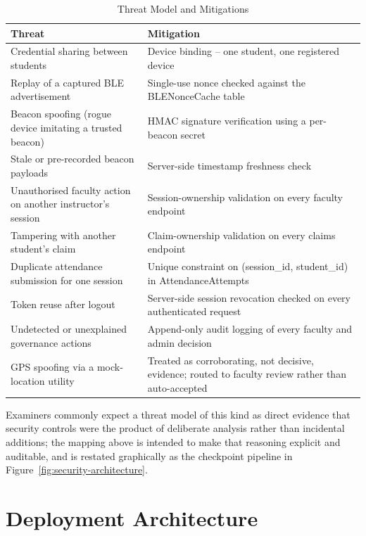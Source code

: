 \documentclass[12pt, a4paper, oneside]{report}
\begin{document}
\begin{table}[htbp]
\centering
\caption{Threat Model and Mitigations}
\label{tab:threat-model}
\small
\begin{tabularx}{\textwidth}{|X|X|}
\hline
\textbf{Threat} & \textbf{Mitigation} \\
\hline
Credential sharing between students & Device binding -- one student, one registered device \\
\hline
Replay of a captured BLE advertisement & Single-use nonce checked against the BLENonceCache table \\
\hline
Beacon spoofing (rogue device imitating a trusted beacon) & HMAC signature verification using a per-beacon secret \\
\hline
Stale or pre-recorded beacon payloads & Server-side timestamp freshness check \\
\hline
Unauthorised faculty action on another instructor's session & Session-ownership validation on every faculty endpoint \\
\hline
Tampering with another student's claim & Claim-ownership validation on every claims endpoint \\
\hline
Duplicate attendance submission for one session & Unique constraint on (session\_id, student\_id) in AttendanceAttempts \\
\hline
Token reuse after logout & Server-side session revocation checked on every authenticated request \\
\hline
Undetected or unexplained governance actions & Append-only audit logging of every faculty and admin decision \\
\hline
GPS spoofing via a mock-location utility & Treated as corroborating, not decisive, evidence; routed to faculty review rather than auto-accepted \\
\hline
\end{tabularx}
\end{table}

Examiners commonly expect a threat model of this kind as direct evidence that security controls were the product of deliberate analysis rather than incidental additions; the mapping above is intended to make that reasoning explicit and auditable, and is restated graphically as the checkpoint pipeline in Figure~\ref{fig:security-architecture}.

\section{Deployment Architecture}
\end{document}
